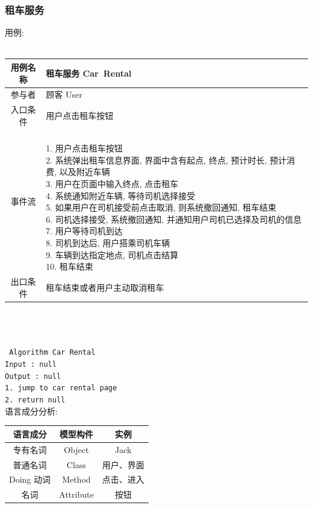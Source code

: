 \documentclass[11pt]{article}
\begin{document}
		\subsubsection{租车服务}
			用例: \\ \\
			\begin{tabular}{c|l}
			\hline
			用例名称 & 租车服务 Car\ Rental \\ \hline
			参与者 & 顾客 User  \\ \hline
			入口条件 & 用户点击租车按钮 \\ \hline
			事件流 & 	\parbox{33em}{\ \\
						1. 用户点击租车按钮 \\
						2. 系统弹出租车信息界面, 界面中含有起点, 终点, 预计时长, 预计消费, 以及附近车辆 \\
						3. 用户在页面中输入终点, 点击租车  \\
						4. 系统通知附近车辆, 等待司机选择接受 \\
						5. 如果用户在司机接受前点击取消, 则系统撤回通知, 租车结束 \\
						6. 司机选择接受, 系统撤回通知, 并通知用户司机已选择及司机的信息 \\
						7. 用户等待司机到达 \\
						8. 司机到达后, 用户搭乘司机车辆 \\
						9. 车辆到达指定地点, 司机点击结算 \\
						10. 租车结束 \\
						} \\ \hline
			出口条件 & 租车结束或者用户主动取消租车 \\ \hline
			\end{tabular} \\ \\ \\
			\texttt{
			Algorithm Car Rental \\
			Input : null \\
			Output : null \\
			1. jump to car rental page \\
			2. return null
			} \\
			
			语言成分分析:
			\begin{center}
			\begin{tabular}{|c|c|c|}
			\hline
			语言成分 & 模型构件 & 实例\\ \hline
			专有名词 & Object & Jack  \\ \hline
			普通名词 & Class & 用户、界面 \\ \hline
			Doing 动词 & Method &  点击、进入 \\ \hline
			名词 & Attribute & 按钮 \\ \hline
			\end{tabular}
			\end{center}
			
\end{document}
